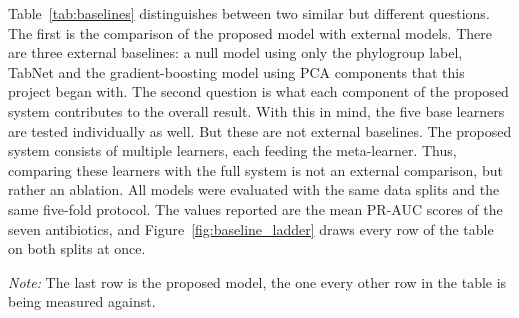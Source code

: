 Table~\ref{tab:baselines} distinguishes between two similar but different
questions. The first is the comparison of the proposed model with external
models. There are three external baselines: a null model using only the
phylogroup label, TabNet and the gradient-boosting model using PCA components
that this project began with. The second question is what each component of the
proposed system contributes to the overall result. With this in mind, the five
base learners are tested individually as well. But these are not external
baselines. The proposed system consists of multiple learners, each feeding the
meta-learner. Thus, comparing these learners with the full system is not an
external comparison, but rather an ablation. All models were evaluated with the
same data splits and the same five-fold protocol. The values reported are the
mean PR-AUC scores of the seven antibiotics, and Figure~\ref{fig:baseline_ladder}
draws every row of the table on both splits at once.

\begin{table}[htb]
\centering
\caption{Comparisons of the proposed model with external baselines and results of
the component models. The phylogroup-only and PCA baselines were not evaluated
with the lineage holdout.}
\label{tab:baselines}
\small
{}
\vspace{0.4em}

\noindent\footnotesize\textit{Note:} The last row is the proposed model, the one every other row
in the table is being measured against.
\end{table}

